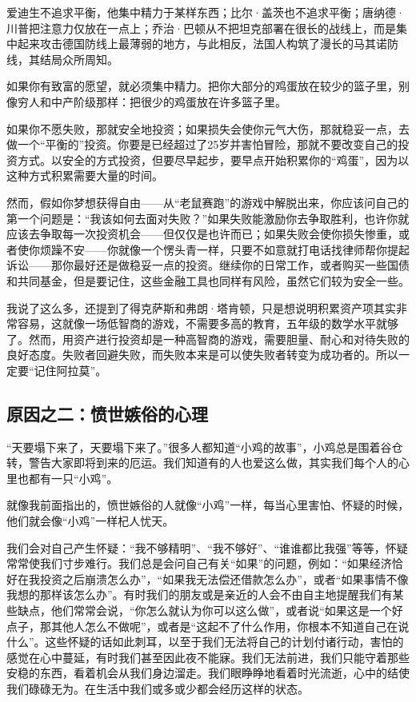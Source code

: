 爱迪生不追求平衡，他集中精力于某样东西；比尔·盖茨也不追求平衡；唐纳德·川普把注意力仅放在一点上；乔治·巴顿从不把坦克部署在很长的战线上，而是集中起来攻击德国防线上最薄弱的地方，与此相反，法国人构筑了漫长的马其诺防线，其结局众所周知。

如果你有致富的愿望，就必须集中精力。把你大部分的鸡蛋放在较少的篮子里，别像穷人和中产阶级那样：把很少的鸡蛋放在许多篮子里。

如果你不愿失败，那就安全地投资；如果损失会使你元气大伤，那就稳妥一点，去做一个“平衡的”投资。你要是已经超过了25岁并害怕冒险，那就不要改变自己的投资方式。以安全的方式投资，但要尽早起步，要早点开始积累你的“鸡蛋”，因为以这种方式积累需要大量的时间。

然而，假如你梦想获得自由——从“老鼠赛跑”的游戏中解脱出来，你应该问自己的第一个问题是：“我该如何去面对失败？”如果失败能激励你去争取胜利，也许你就应该去争取每一次投资机会——但仅仅是也许而已；如果失败会使你损失惨重，或者使你烦躁不安——你就像一个愣头青一样，只要不如意就打电话找律师帮你提起诉讼——那你最好还是做稳妥一点的投资。继续你的日常工作，或者购买一些国债和共同基金，但是要记住，这些金融工具也同样有风险，虽然它们较为安全一些。

我说了这么多，还提到了得克萨斯和弗朗·塔肯顿，只是想说明积累资产项其实非常容易，这就像一场低智商的游戏，不需要多高的教育，五年级的数学水平就够了。然而，用资产进行投资却是一种高智商的游戏，需要胆量、耐心和对待失败的良好态度。失败者回避失败，而失败本来是可以使失败者转变为成功者的。所以一定要“记住阿拉莫”。

\subsection*{原因之二：愤世嫉俗的心理}


“天要塌下来了，天要塌下来了。”很多人都知道“小鸡的故事”，小鸡总是围着谷仓转，警告大家即将到来的厄运。我们知道有的人也爱这么做，其实我们每个人的心里也都有一只“小鸡”。

就像我前面指出的，愤世嫉俗的人就像“小鸡”一样，每当心里害怕、怀疑的时候，他们就会像“小鸡”一样杞人忧天。

我们会对自己产生怀疑：“我不够精明”、“我不够好”、“谁谁都比我强”等等，怀疑常常使我们寸步难行。我们总是会问自己有关“如果”的问题，例如：“如果经济恰好在我投资之后崩溃怎么办”，“如果我无法偿还借款怎么办”，或者“如果事情不像我想的那样该怎么办”。有时我们的朋友或是亲近的人会不由自主地提醒我们有某些缺点，他们常常会说，“你怎么就认为你可以这么做”，或者说“如果这是一个好点子，那其他人怎么不做呢”，或者是“这起不了什么作用，你根本不知道自己在说什么”。这些怀疑的话如此刺耳，以至于我们无法将自己的计划付诸行动，害怕的感觉在心中蔓延，有时我们甚至因此夜不能寐。我们无法前进，我们只能守着那些安稳的东西，看着机会从我们身边溜走。我们眼睁睁地看着时光流逝，心中的结使我们碌碌无为。在生活中我们或多或少都会经历这样的状态。

